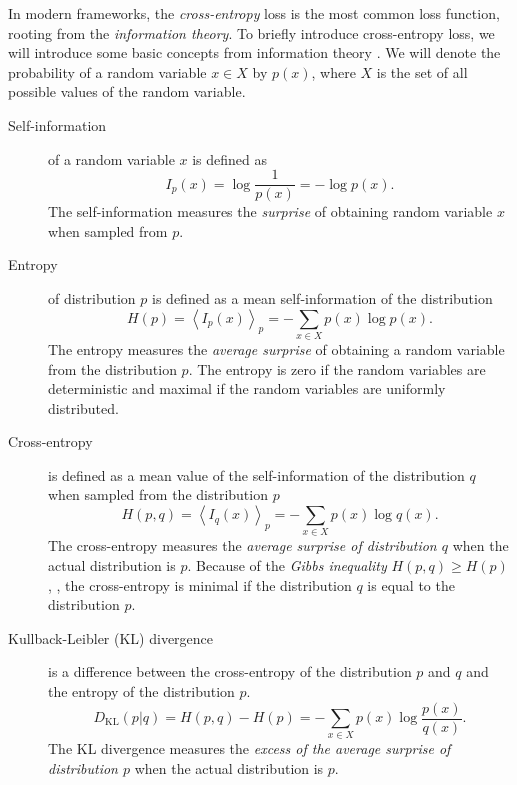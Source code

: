 In modern \dl frameworks, the \emph{cross-entropy} loss is the most common loss function, rooting from the \emph{information theory}.
To briefly introduce cross-entropy loss, we will introduce some basic concepts from information theory \cite{shannon}.
We will denote the probability of a random variable $x \in X$ by $p(x)$, where $X$ is the set of all possible values of the random variable.
\begin{description}
    \item [Self-information] of a random variable $x$ is defined as
    \begin{equation}
        I_p(x) = \log \frac{1}{p(x)} =- \log p(x).
    \end{equation}
    The self-information measures the \emph{surprise} of obtaining random variable $x$ when sampled from $p$.
    \item[Entropy] of distribution $p$ is defined as a mean self-information of the distribution
    \begin{equation}
        H(p) = \left< I_p(x)\right>_p = - \sum_{x \in X} p(x) \log p(x).
    \end{equation}
    The entropy measures the \emph{average surprise} of obtaining a random variable from the distribution $p$.
    The entropy is zero if the random variables are deterministic and maximal if the random variables are uniformly distributed.
    \item[Cross-entropy] is defined as a mean value of the self-information of the distribution $q$ when sampled from the distribution $p$
    \begin{equation}
        H(p,q) = \left< I_q(x)\right>_p = - \sum_{x \in X} p(x) \log q(x).
    \end{equation}
    The cross-entropy measures the \emph{average surprise of distribution $q$} when the actual distribution is $p$.
    Because of the \emph{Gibbs inequality} $H(p,q) \geq H(p)$, \cite{information_theory}, the cross-entropy is minimal if the distribution $q$ is equal to the distribution $p$.
    \item[Kullback-Leibler (KL) divergence] is a difference between the cross-entropy of the distribution $p$ and $q$ and the entropy of the distribution $p$.
    \begin{equation}
        D_{\text{KL}}(p|q) =  H(p,q) - H(p) = - \sum_{x \in X} p(x) \log \frac{p(x)}{q(x)}.
    \end{equation}
    The KL divergence measures the \emph{excess of the average surprise of distribution $p$} when the actual distribution is $p$.
\end{description} 

